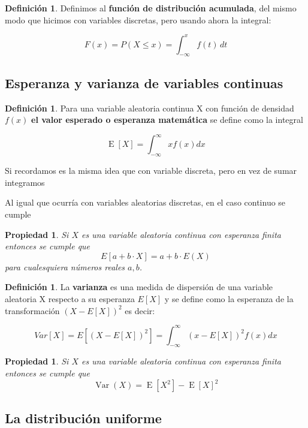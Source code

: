 \documentclass[]{book}
\theoremstyle{plain}
\newtheorem{property}[theorem]{Propiedad}
\theoremstyle{definition}
\newtheorem{definition}[theorem]{Definición}
\theoremstyle{definition} %
\begin{document}
\begin{definition}
  Definimos al \textbf{función de distribución acumulada}, del mismo modo que
hicimos con variables discretas, pero usando ahora la integral:

\[F(x)=P(X\leq x)=\int _{-\infty }^{x}f(t)\,dt\]

\end{definition}

\subsection{Esperanza y varianza de variables continuas} 

\begin{definition}
  Para una variable aleatoria continua X con función de densidad
\(\displaystyle f(x)\) \textbf{el valor esperado o esperanza matemática}
se define como la integral

\[\displaystyle \operatorname {E} [X]=\int^{\infty}_{-\infty }xf(x)dx\]

Si recordamos es la misma idea que con variable discreta, pero en vez de
sumar integramos
\end{definition}

Al igual que ocurría con variables aleatorias discretas, en el caso continuo se cumple 

\begin{property}
  Si $X$ es una variable aleatoria continua con esperanza finita entonces se cumple que 
  \[E[a + b \cdot X] = a + b \cdot E(X)\] para cualesquiera números reales $a,b$.
\end{property}


\begin{definition}
  La \textbf{varianza} es una medida de dispersión de una variable aleatoria X respecto a su esperanza $E[X]$ y se define como la esperanza de la transformación $(X - E[X])^2$ es decir:
  
  \[Var[X]= E[(X- E[X])^2] = \int^{\infty}_{-\infty }(x-E[X])^2f(x)dx\]
\end{definition}


\begin{property}
  Si $X$ es una variable aleatoria continua con esperanza finita entonces se cumple que 
   \[
    \operatorname {Var} (X) =\operatorname {E} \left[X^{2}\right]-\operatorname {E} [X]^{2} 
 \]
\end{property}

\subsection{La distribución
uniforme} 
\end{document}
